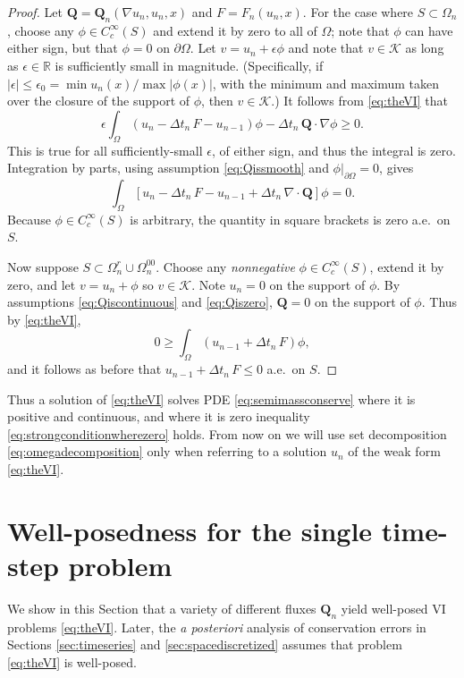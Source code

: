 \documentclass[final,onefignum]{siamart190516}
\newcommand\bQ{\mathbf{Q}}
\newcommand{\Div}{\nabla\cdot}
\newcommand\eps{\epsilon}
\newcommand{\grad}{\nabla}
\newcommand\RR{\mathbb{R}}
\begin{document}
\begin{proof}  Let $\bQ = \bQ_n(\grad u_n,u_n,x)$ and $F=F_n(u_n,x)$.  For the case where $S \subset \Omega_n$, choose any $\phi\in C_c^\infty(S)$ and extend it by zero to all of $\Omega$; note that $\phi$ can have either sign, but that $\phi=0$ on $\partial\Omega$.  Let $v = u_n + \eps \phi$ and note that $v \in \mathcal{K}$ as long as $\eps\in\RR$ is sufficiently small in magnitude.  (Specifically, if $|\eps|\le \eps_0 = \min u_n(x) / \max |\phi(x)|$, with the minimum and maximum taken over the closure of the support of $\phi$, then $v \in \mathcal{K}$.)  It follows from \eqref{eq:theVI} that
   $$\eps \int_\Omega \left(u_n - \Delta t_n\,F - u_{n-1}\right)\phi - \Delta t_n\,\bQ \cdot \grad \phi \ge 0.$$
This is true for all sufficiently-small $\eps$, of either sign, and thus the integral is zero.  Integration by parts, using assumption \eqref{eq:Qissmooth} and $\phi\big|_{\partial\Omega}=0$, gives
   $$\int_\Omega \left[ u_n - \Delta t_n\,F - u_{n-1} + \Delta t_n\,\Div\bQ \right]\phi = 0.$$
Because $\phi\in C_c^\infty(S)$ is arbitrary, the quantity in square brackets is zero a.e.~on $S$.

Now suppose $S \subset \Omega_n^r \cup \Omega_n^{00}$.  Choose any \emph{nonnegative} $\phi\in C_c^\infty(S)$, extend it by zero, and let $v = u_n + \phi$ so $v\in\mathcal{K}$.  Note $u_n=0$ on the support of $\phi$.  By assumptions \eqref{eq:Qiscontinuous} and \eqref{eq:Qiszero}, $\bQ=0$ on the support of $\phi$.  Thus by \eqref{eq:theVI},
    $$0 \ge \int_{\Omega} \left(u_{n-1} + \Delta t_n\, F\right) \phi,$$
and it follows as before that $u_{n-1} + \Delta t_n\, F \le 0$ a.e.~on $S$. \end{proof}

Thus a solution of \eqref{eq:theVI} solves PDE \eqref{eq:semimassconserve} where it is positive and continuous, and where it is zero inequality \eqref{eq:strongconditionwherezero} holds.  From now on we will use set decomposition \eqref{eq:omegadecomposition} only when referring to a solution $u_n$ of the weak form \eqref{eq:theVI}.


\section{Well-posedness for the single time-step problem} \label{sec:wellposed}

We show in this Section that a variety of different fluxes $\bQ_n$ yield well-posed VI problems \eqref{eq:theVI}.  Later, the \emph{a posteriori} analysis of conservation errors in Sections \ref{sec:timeseries} and \ref{sec:spacediscretized} assumes that problem \eqref{eq:theVI} is well-posed.
\end{document}
